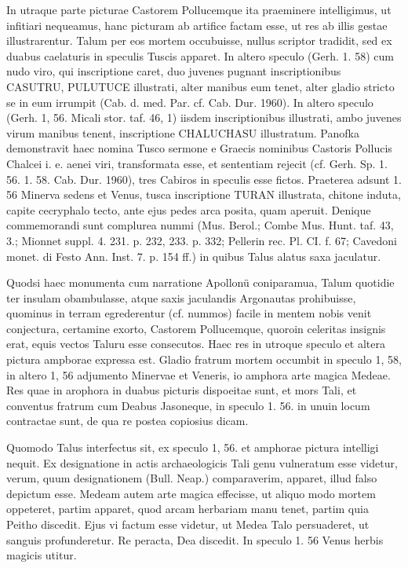 \documentclass[a4paper, 11pt, oneside, polutonikogreek, german]{article}
\begin{document}
In utraque parte picturae Castorem Pollucemque ita praeminere intelligimus, ut infitiari nequeamus, hanc picturam ab artifice factam esse, ut res ab illis gestae illustrarentur. Talum per eos mortem occubuisse, nullus scriptor tradidit, sed ex duabus caelaturis in speculis Tuscis apparet. In altero speculo (Gerh. 1. 58) cum nudo viro, qui inscriptione caret, duo juvenes pugnant inscriptionibus CASUTRU, PULUTUCE illustrati, alter manibus eum tenet, alter gladio stricto se in eum irrumpit (Cab. d. med. Par. cf. Cab. Dur. 1960). In altero speculo (Gerh. 1, 56. Micali stor. taf. 46, 1) iisdem inscriptionibus illustrati, ambo juvenes virum manibus tenent, inscriptione CHALUCHASU illustratum. Panofka demonstravit haec nomina Tusco sermone e Graecis nominibus Castoris Pollucis Chalcei i. e. aenei viri, transformata esse, et sententiam rejecit (cf. Gerh. Sp. 1. 56. 1. 58. Cab. Dur. 1960), tres Cabiros in speculis esse fictos. Praeterea adsunt 1. 56 Minerva sedens et Venus, tusca inscriptione TURAN illustrata, chitone induta, capite cecryphalo tecto, ante ejus pedes arca posita, quam aperuit. Denique commemorandi sunt complurea nummi (Mus. Berol.; Combe Mus. Hunt. taf. 43, 3.; Mionnet suppl. 4. 231. p. 232, 233. p. 332; Pellerin rec. Pl. CI. f. 67; Cavedoni monet. di Festo Ann. Inst. 7. p. 154 ff.) in quibus Talus alatus saxa jaculatur.

Quodsi haec monumenta cum narratione Apollonü coniparamua, Talum quotidie ter insulam obambulasse, atque saxis jaculandis Argonautas prohibuisse, quominus in terram egrederentur (cf. nummos) facile in mentem nobis venit conjectura, certamine exorto, Castorem Pollucemque, quoroin celeritas insignis erat, equis vectos Taluru esse consecutos. Haec res in utroque speculo et altera pictura ampborae expressa est. Gladio fratrum mortem occumbit in speculo 1, 58, in altero 1, 56 adjumento Minervae et Veneris, io amphora arte magica Medeae. Res quae in arophora in duabus picturis dispoeitae sunt, et mors Tali, et conventus fratrum cum Deabus Jasoneque, in speculo 1. 56. in unuin locum contractae sunt, de qua re postea copiosius dicam.

Quomodo Talus interfectus sit, ex speculo 1, 56. et amphorae pictura intelligi nequit. Ex designatione in actis archaeologicis Tali genu vulneratum esse videtur, verum, quum designationem (Bull. Neap.) comparaverim, apparet, illud falso depictum esse. Medeam autem arte magica effecisse, ut aliquo modo mortem oppeteret, partim apparet, quod arcam herbariam manu tenet, partim quia Peitho discedit. Ejus vi factum esse videtur, ut Medea Talo persuaderet, ut sanguis profunderetur. Re peracta, Dea discedit. In speculo 1. 56 Venus herbis magicis utitur.
\end{document}
